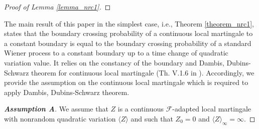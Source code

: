 \documentclass[aop]{imsart}
\theoremstyle{plain}
\theoremstyle{remark}
\begin{document}
\begin{proof}[Proof of Lemma \ref{lemma_nrc1}]
\end{proof}
\noindent The main result of this paper in the simplest case, i.e., Theorem \ref{theorem_nrc1}, states that the boundary crossing probability of a continuous local martingale to a constant boundary is equal to the boundary crossing probability of a standard Wiener process to a constant boundary up to a time change of quadratic variation value. It relies on the constancy of the boundary and Dambis, Dubins-Schwarz theorem for continuous local martingale (Th. V.1.6 in \cite{revuz2013continuous}).  Accordingly, we provide the assumption on the continuous local martingale which is required to apply Dambis, Dubins-Schwarz theorem.
\begin{proof}[\textbf{Assumption A}]
We assume that $Z$ is a continuous $\mathcal{F}$-adapted local martingale with nonrandom quadratic variation $\langle Z\rangle$ and such that $Z_0=0$ and $\langle Z\rangle_{\infty} = \infty$.
\phantom\qedhere
\end{proof} 
\end{document}
